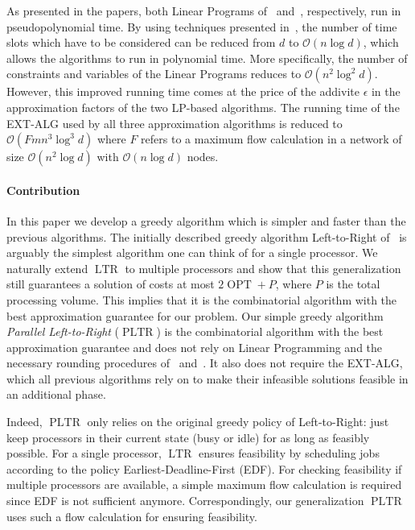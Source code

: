 \documentclass[a4paper]{article}
\DeclareMathOperator{\OPT}{OPT}
\DeclareMathOperator{\PLTR}{PLTR}
\DeclareMathOperator{\LTR}{LTR}
\begin{document}
As presented in the papers, both Linear Programs of~\cite{antoniadis} and~\cite{skeletons}, respectively, run in pseudopolynomial time.
By using techniques presented in~\cite{antoniadis}, the number of time slots which have to be considered can be reduced from $d$ to $\mathcal{O}(n \log d)$, which allows the algorithms to run in polynomial time.
More specifically, the number of constraints and variables of the Linear Programs reduces to $\mathcal{O}(n^2 \log^2 d)$.
However, this improved running time comes at the price of the addivite $\epsilon$ in the approximation factors of the two LP-based algorithms.
The running time of the EXT-ALG used by all three approximation algorithms is reduced to $\mathcal{O}(F m n^3 \log^3 d)$ where $F$ refers to a maximum flow calculation in a network of size $\mathcal{O}(n^2 \log d)$ with $\mathcal{O}(n \log d)$ nodes.

\paragraph{Contribution}
In this paper we develop a greedy algorithm which is simpler and faster than the previous algorithms.
The initially described greedy algorithm Left-to-Right of~\cite{irani_left_to_right_soda_2003} is arguably the simplest algorithm one can think of for a single processor.
We naturally extend $\LTR$ to multiple processors and show that this generalization still guarantees a solution of costs at most $2 \OPT + P$, where $P$ is the total processing volume.
This implies that it is the combinatorial algorithm with the best approximation guarantee for our problem.
Our simple greedy algorithm \textit{Parallel Left-to-Right} ($\PLTR$) is the combinatorial algorithm with the best approximation guarantee and does not rely on Linear Programming and the necessary rounding procedures of~\cite{antoniadis} and~\cite{skeletons}.
It also does not require the EXT-ALG, which all previous algorithms rely on to make their infeasible solutions feasible in an additional phase.

Indeed, $\PLTR$ only relies on the original greedy policy of Left-to-Right: just keep processors in their current state (busy or idle) for as long as feasibly possible.
For a single processor, $\LTR$ ensures feasibility by scheduling jobs according to the policy Earliest-Deadline-First (EDF).
For checking feasibility if multiple processors are available, a simple maximum flow calculation is required since EDF is not sufficient anymore.
Correspondingly, our generalization $\PLTR$ uses such a flow calculation for ensuring feasibility.
\end{document}
